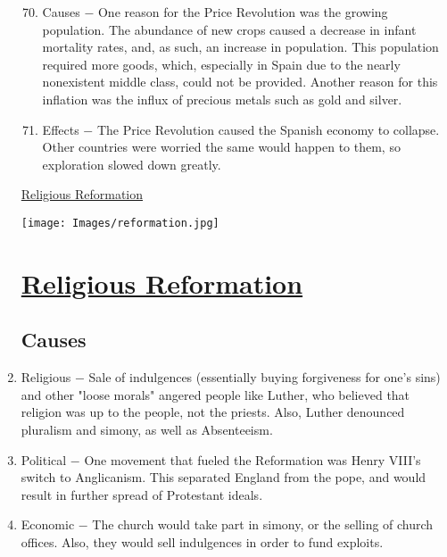 \documentclass[12pt]{article}
\begin{document}
\begin{enumerate}
\begin{enumerate}[label=\arabic{*}.]
\setcounter{enumii}{69}
\item Causes $-$ One reason for the Price Revolution was the growing population. The abundance of new crops caused a decrease in infant mortality rates, and, as such, an increase in population. This population required more goods, which, especially in Spain due to the nearly nonexistent middle class, could not be provided. Another reason for this inflation was the influx of precious metals such as gold and silver.

\item Effects $-$ The Price Revolution caused the Spanish economy to collapse. Other countries were worried the same would happen to them, so exploration slowed down greatly.
\end{enumerate}

\newpage
\begin{center}
\end{center}
\begin{center}
\end{center}
\begin{center}
\underline{\Huge Religious Reformation}
\end{center}
\vspace{50pt}
\texttt{[image: Images/reformation.jpg]}
\newpage

\setcounter{enumi}{71}
\section{\underline{Religious Reformation}}

\subsection{Causes}

\item Religious $-$ Sale of indulgences (essentially buying forgiveness for one's sins) and other "loose morals" angered people like Luther, who believed that religion was up to the people, not the priests. Also, Luther denounced pluralism and simony, as well as Absenteeism.

\item Political $-$ One movement that fueled the Reformation was Henry VIII's switch to Anglicanism. This separated England from the pope, and would result in further spread of Protestant ideals.

\item Economic $-$ The church would take part in simony, or the selling of church offices. Also, they would sell indulgences in order to fund exploits.


\end{enumerate}
\end{document}
